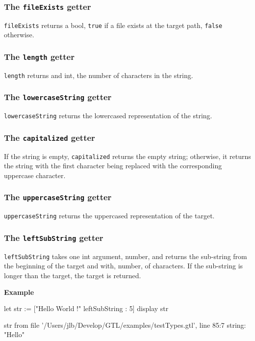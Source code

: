 \documentclass[10pt,openright,twosides,final]{memoir}
\newcommand{\gtlarg}[1]{{\footnotesize\ttfamily\colorbox{light-blue}{#1}}}
\newcommand{\gtlinline}[1]{\colorbox{light-blue}{\lstinline[language=gtl]{#1}}}
\newcommand{\example}{\vspace{.75em}\noindent\textbf{Example}\vspace{0em}}
\begin{document}
\subsubsection{The \texttt{fileExists} getter}

\gtlinline{fileExists} returns a bool, \gtlinline{true} if a file exists at the target path, \gtlinline{false} otherwise.


\subsubsection{The \texttt{length} getter}

\gtlinline{length} returns and int, the number of characters in the string.

\subsubsection{The \texttt{lowercaseString} getter}

\gtlinline{lowercaseString} returns the lowercased representation of the string.

\subsubsection{The \texttt{capitalized} getter}

If the string is empty, \gtlinline{capitalized} returns the empty string; otherwise, it returns the string with the first character being replaced with the corresponding uppercase character.

\subsubsection{The \texttt{uppercaseString} getter}

\gtlinline{uppercaseString} returns the uppercased representation of the target.

\subsubsection{The \texttt{leftSubString} getter}

\gtlinline{leftSubString} takes one int argument, \gtlarg{number}, and returns the sub-string from the beginning of the target and with, \gtlarg{number}, of characters. If the sub-string is longer than the target, the target is returned.

\example
\begin{gtl}
let str := ["Hello World !" leftSubString : 5]
display str
\end{gtl}
\begin{console}
str from file '/Users/jlb/Develop/GTL/examples/testTypes.gtl', line 85:7
    string: "Hello"
\end{console}
\end{document}
